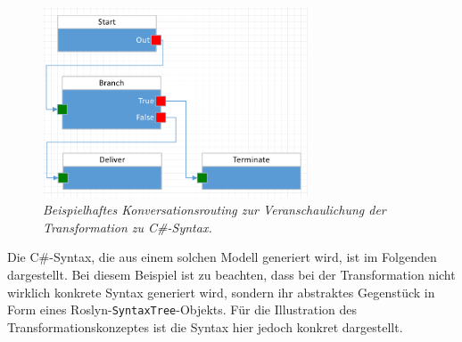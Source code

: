 \begin{figure} %
	\centering
		\includegraphics[width=0.7\textwidth]{img/FlowToCodeExample.png}
	\caption[Beispielhaftes Konversationsrouting zur Veranschaulichung der Transformation zu C\#-Syntax]{\textit{Beispielhaftes Konversationsrouting zur Veranschaulichung der Transformation zu C\#-Syntax.}}
	\label{fig:FlowToCode}
\end{figure}
\noindent Die C\#-Syntax, die aus einem solchen Modell generiert wird, ist im Folgenden dargestellt. Bei diesem Beispiel ist zu beachten, dass bei der Transformation nicht wirklich konkrete Syntax generiert wird, sondern ihr abstraktes Gegenstück in Form eines Roslyn-\texttt{SyntaxTree}-Objekts. Für die Illustration des Transformationskonzeptes ist die Syntax hier jedoch konkret dargestellt.



